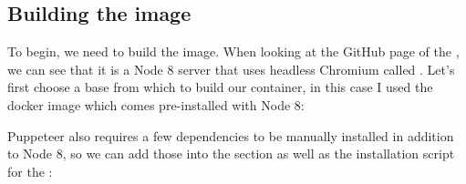 \documentclass[letterpaper,10pt,english]{sphinxmanual}
\begin{document}
\subsection{Building the image}
\label{\detokenize{running_services:building-the-image}}
To begin, we need to build the image. When looking at the GitHub page of
the , we can see that it is a Node 8 server that uses headless Chromium
called . Let’s first choose a base from which to build our
container, in this case I used the docker image  which comes
pre-installed with Node 8:

%
\begin{sphinxVerbatim}[commandchars=\\\{\}]
 

 

 
\end{sphinxVerbatim}

\begin{DUlineblock}{0em}
\item[] Puppeteer also requires a few dependencies to be manually installed in
addition to Node 8, so we can add those into the  section as well as
the installation script for the :
\end{DUlineblock}
\end{document}
